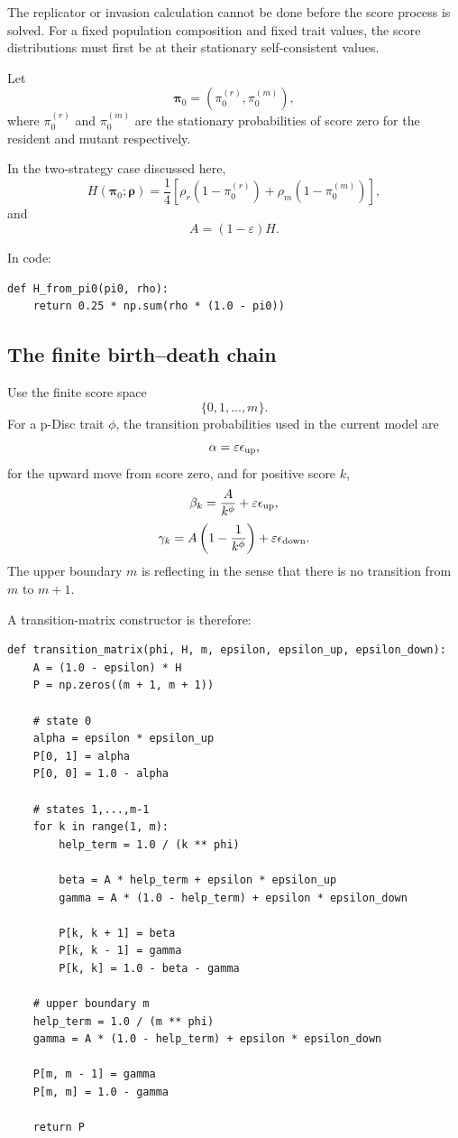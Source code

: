 \documentclass[11pt]{article}
\begin{document}
The replicator or invasion calculation cannot be done before the score process is solved. For a fixed population composition and fixed trait values, the score distributions must first be at their stationary self-consistent values.

Let
\[
\bm{\pi}_0
=
\left(
\pi_0^{(r)},
\pi_0^{(m)}
\right),
\]
where $\pi_0^{(r)}$ and $\pi_0^{(m)}$ are the stationary probabilities of score zero for the resident and mutant respectively.

In the two-strategy case discussed here,
\[
H(\bm{\pi}_0;\bm{\rho})
=
\frac14\left[
\rho_r\left(1-\pi_0^{(r)}\right)
+
\rho_m\left(1-\pi_0^{(m)}\right)
\right],
\]
and
\[
A=(1-\varepsilon)H.
\]

In code:

\begin{lstlisting}
def H_from_pi0(pi0, rho):
    return 0.25 * np.sum(rho * (1.0 - pi0))
\end{lstlisting}

\subsection{The finite birth--death chain}

Use the finite score space
\[
\{0,1,\ldots,m\}.
\]
For a p-Disc trait $\phi$, the transition probabilities used in the current model are
\[
\alpha=\varepsilon\epsilon_{\rm up},
\]
for the upward move from score zero, and for positive score $k$,
\[
\beta_k
=
\frac{A}{k^\phi}
+
\varepsilon\epsilon_{\rm up},
\]
\[
\gamma_k
=
A\left(1-\frac{1}{k^\phi}\right)
+
\varepsilon\epsilon_{\rm down}.
\]
The upper boundary $m$ is reflecting in the sense that there is no transition from $m$ to $m+1$.

A transition-matrix constructor is therefore:

\begin{lstlisting}
def transition_matrix(phi, H, m, epsilon, epsilon_up, epsilon_down):
    A = (1.0 - epsilon) * H
    P = np.zeros((m + 1, m + 1))

    # state 0
    alpha = epsilon * epsilon_up
    P[0, 1] = alpha
    P[0, 0] = 1.0 - alpha

    # states 1,...,m-1
    for k in range(1, m):
        help_term = 1.0 / (k ** phi)

        beta = A * help_term + epsilon * epsilon_up
        gamma = A * (1.0 - help_term) + epsilon * epsilon_down

        P[k, k + 1] = beta
        P[k, k - 1] = gamma
        P[k, k] = 1.0 - beta - gamma

    # upper boundary m
    help_term = 1.0 / (m ** phi)
    gamma = A * (1.0 - help_term) + epsilon * epsilon_down

    P[m, m - 1] = gamma
    P[m, m] = 1.0 - gamma

    return P
\end{lstlisting}
\end{document}
